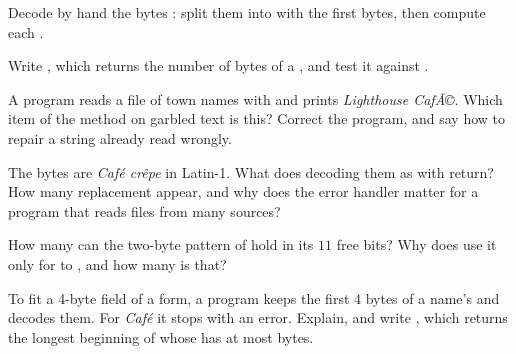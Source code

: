 \begin{exercise}[$\star\star$]\label{exo:g10:text-encodings:6}
Decode by hand the  bytes : split them into  with the first bytes, then
compute each .
\end{exercise}

\begin{exercise}[$\star\star$]\label{exo:g10:text-encodings:7}
Write , which returns the number of  bytes of a , and test it against
.
\end{exercise}

\begin{exercise}[$\star\star$]\label{exo:g10:text-encodings:8}
A program reads a  file of town names with  and prints
\textit{Lighthouse CafÃ©}. Which item of the method on garbled text is this? Correct the program, and say how to
repair a string already read wrongly.
\end{exercise}

\begin{exercise}[$\star\star$]\label{exo:g10:text-encodings:9}
The bytes  are \textit{Café crêpe} in Latin-1. What does decoding them as
 with  return? How many replacement 
appear, and why does the error handler matter for a program that reads files from many sources?
\end{exercise}

\begin{exercise}[$\star\star$]\label{exo:g10:text-encodings:10}
How many  can the two-byte pattern of  hold in its $11$ free bits? Why does  use it only for
 to , and how many  is that?
\end{exercise}

\begin{exercise}[$\star\star$]\label{exo:g10:text-encodings:11}
To fit a 4-byte field of a form, a program keeps the first $4$ bytes of a name's   and decodes them. For
\textit{Café} it stops with an error. Explain, and write , which returns the longest beginning of
 whose   has at most  bytes.
\end{exercise}


